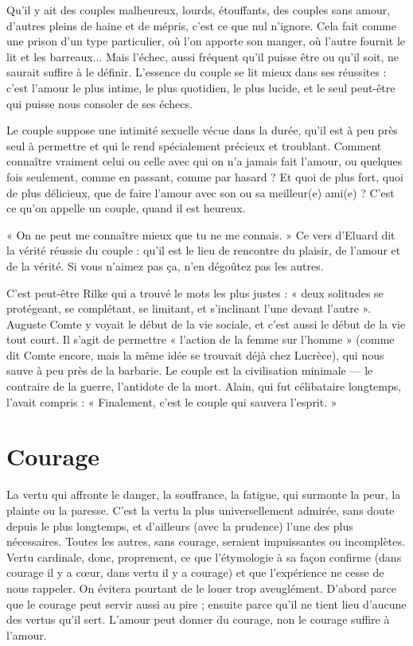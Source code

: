 Qu'il y ait des couples malheureux, lourds, étouffants, des couples sans
amour, d’autres pleins de haine et de mépris, c’est ce que nul n’ignore. Cela fait
comme une prison d’un type particulier, où l’on apporte son manger, où
l'autre fournit le lit et les barreaux... Mais l'échec, aussi fréquent qu’il puisse
être ou qu’il soit, ne saurait suffire à le définir. L’essence du couple se lit mieux
dans ses réussites : c’est l’amour le plus intime, le plus quotidien, le plus lucide,
et le seul peut-être qui puisse nous consoler de ses échecs.

Le couple suppose une intimité sexuelle vécue dans la durée, qu’il est à peu
près seul à permettre et qui le rend spécialement précieux et troublant. Comment
connaître vraiment celui ou celle avec qui on n’a jamais fait l'amour, ou
quelques fois seulement, comme en passant, comme par hasard ? Et quoi de
plus fort, quoi de plus délicieux, que de faire l’amour avec son ou sa meilleur(e)
ami(e) ? C’est ce qu’on appelle un couple, quand il est heureux.

« On ne peut me connaître mieux que tu ne me connais. » Ce vers d’Eluard
dit la vérité réussie du couple : qu’il est le lieu de rencontre du plaisir, de
l'amour et de la vérité. Si vous n’aimez pas ça, n’en dégoûtez pas les autres.

C’est peut-être Rilke qui a trouvé le mots les plus justes : « deux solitudes
se protégeant, se complétant, se limitant, et s’inclinant l’une devant l’autre ».
Auguste Comte y voyait le début de la vie sociale, et c’est aussi le début de la
vie tout court. Il s’agit de permettre « l’action de la femme sur l’homme »
(comme dit Comte encore, mais la même idée se trouvait déjà chez Lucrèce),
qui nous sauve à peu près de la barbarie. Le couple est la civilisation minimale
— le contraire de la guerre, l’antidote de la mort. Alain, qui fut célibataire longtemps,
l’avait compris : « Finalement, c’est le couple qui sauvera l’esprit. »

\section{Courage}
La vertu qui affronte le danger, la souffrance, la fatigue, qui
surmonte la peur, la plainte ou la paresse. C’est la vertu la plus
universellement admirée, sans doute depuis le plus longtemps, et d’ailleurs
(avec la prudence) l’une des plus nécessaires. Toutes les autres, sans courage,
seraient impuissantes ou incomplètes. Vertu cardinale, donc, proprement, ce
que l’étymologie à sa façon confirme (dans courage il y a cœur, dans vertu il y
a courage) et que l'expérience ne cesse de nous rappeler. On évitera pourtant de
le louer trop aveuglément. D’abord parce que le courage peut servir aussi au
pire ; ensuite parce qu’il ne tient lieu d’aucune des vertus qu’il sert. L'amour
peut donner du courage, non le courage suffire à l'amour.

